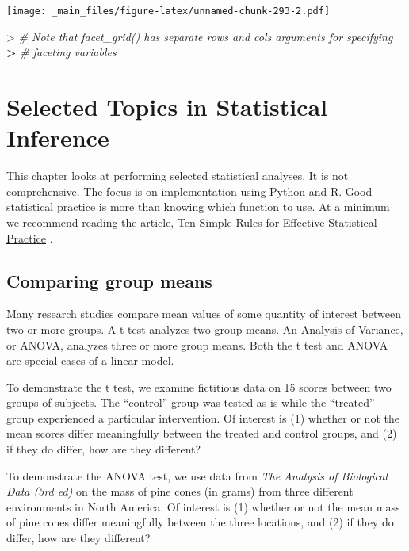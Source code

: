 \documentclass[
]{book}
\newenvironment{Shaded}{\begin{snugshade}}{\end{snugshade}}
\newcommand{\CommentTok}[1]{\textcolor[rgb]{0.56,0.35,0.01}{\textit{#1}}}
\newcommand{\ErrorTok}[1]{\textcolor[rgb]{0.64,0.00,0.00}{\textbf{#1}}}
\newcommand{\SpecialCharTok}[1]{\textcolor[rgb]{0.00,0.00,0.00}{#1}}
\begin{document}
\texttt{[image: \_main\_files/figure-latex/unnamed-chunk-293-2.pdf]}

\begin{Shaded}
\begin{Highlighting}[]
\SpecialCharTok{\textgreater{}} \CommentTok{\# Note that facet\_grid() has separate \textasciigrave{}rows\textasciigrave{} and \textasciigrave{}cols\textasciigrave{} arguments for specifying}
\ErrorTok{\textgreater{}} \CommentTok{\# faceting variables}
\end{Highlighting}
\end{Shaded}

\hypertarget{selected-topics-in-statistical-inference}{%
\chapter{Selected Topics in Statistical Inference}\label{selected-topics-in-statistical-inference}}

This chapter looks at performing selected statistical analyses. It is not comprehensive. The focus is on implementation using Python and R. Good statistical practice is more than knowing which function to use. At a minimum we recommend reading the article, \href{https://journals.plos.org/ploscompbiol/article?id=10.1371/journal.pcbi.1004961}{Ten Simple Rules for Effective Statistical Practice} \citep{kass_caffo_davidian_meng_yu_reid_2016}.

\hypertarget{comparing-group-means}{%
\section{Comparing group means}\label{comparing-group-means}}

Many research studies compare mean values of some quantity of interest between two or more groups. A t test analyzes two group means. An Analysis of Variance, or ANOVA, analyzes three or more group means. Both the t test and ANOVA are special cases of a linear model.

To demonstrate the t test, we examine fictitious data on 15 scores between two groups of subjects. The ``control'' group was tested as-is while the ``treated'' group experienced a particular intervention. Of interest is (1) whether or not the mean scores differ meaningfully between the treated and control groups, and (2) if they do differ, how are they different?

To demonstrate the ANOVA test, we use data from \emph{The Analysis of Biological Data (3rd ed)}\citep{whitlock_schluter_2020} on the mass of pine cones (in grams) from three different environments in North America. Of interest is (1) whether or not the mean mass of pine cones differ meaningfully between the three locations, and (2) if they do differ, how are they different?
\end{document}
